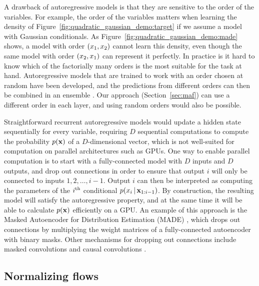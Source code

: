 A drawback of autoregressive models is that they are sensitive to the order of the variables. For example, the order of the variables matters when learning the density of Figure~\ref{fig:quadratic_gaussian_demo:target} if we assume a model with Gaussian conditionals. As Figure~\ref{fig:quadratic_gaussian_demo:made} shows, a model with order $\mathopen{}\left(x_1,x_2\right)\mathclose{}$ cannot learn this density, even though the same model with order $\mathopen{}\left(x_2,x_1\right)\mathclose{}$ can represent it perfectly. In practice is it hard to know which of the factorially many orders is the most suitable for the task at hand. Autoregressive models that are trained to work with an order chosen at random have been developed, and the predictions from different orders can then be combined in an ensemble \citep{Uria:2014, Germain:2015}.
Our approach (Section~\ref{sec:maf}) can use a different order in each layer, and using random orders would also be possible.

Straightforward recurrent autoregressive models would update a hidden state sequentially for every variable, requiring $D$ sequential computations to compute the probability $p\mathopen{}\left(\mathbf{x}\right)\mathclose{}$ of a $D$-dimensional vector, which is not well-suited for computation on parallel architectures such as GPUs.
One way to enable parallel computation is to start with a fully-connected model with $D$ inputs and $D$ outputs, and drop out connections in order to ensure that output $i$ will only be connected to inputs $1, 2, \ldots, i\!-\!1$. Output $i$ can then be interpreted as computing the parameters of the $i^{\text{th}}$ conditional $p\mathopen{}\left(x_i\,|\,\mathbf{x}_{1:i-1}\right)\mathclose{}$. By construction, the resulting model will satisfy the autoregressive property, and at the same time it will be able to calculate $p\mathopen{}\left(\mathbf{x}\right)\mathclose{}$ efficiently on a GPU\@. An example of this approach is the Masked Autoencoder for Distribution Estimation (MADE) \citep{Germain:2015}, which drops out connections by multiplying the weight matrices of a fully-connected autoencoder with binary masks. Other mechanisms for dropping out connections include masked convolutions \citep{VanDenOord:2016:PixelRNN} and causal convolutions \citep{VanDenOord:2016:WaveNet}.

\subsection{Normalizing flows}

